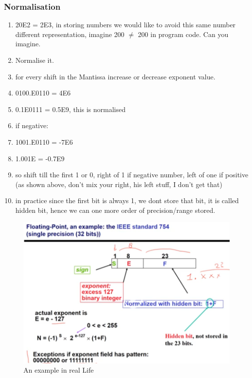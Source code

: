 \documentclass[11pt, a4paper]{article}
\begin{document}
\subsubsection{Normalisation}
\begin{enumerate}
    \item 20E2 = 2E3, in storing numbers we would like to avoid this same number different representation, imagine 200 $\neq$ 200 in program code. Can you imagine.
    \item Normalise it.
    \item for every shift in the Mantissa increase or decrease exponent value.
    \item 0100.E0110 = 4E6
    \item 0.1E0111 = 0.5E9, this is normalised
    \item if negative:
    \item 1001.E0110 = -7E6
    \item 1.001E = -0.7E9
    \item so shift till the first 1 or 0, right of 1 if negative number, left of one if positive (as shown above, don't mix your right, his left stuff, I don't get that)
    \item in practice since the first bit is always 1, we dont store that bit, it is called hidden bit, hence we can one more order of precision/range stored.
\end{enumerate}
\begin{figure}[H]
    \centering
    \includegraphics[width = \textwidth]{Module 5/Notes/Pictures/Floating Point Standard.png}
    \caption{An example in real Life}
\end{figure}
\end{document}
